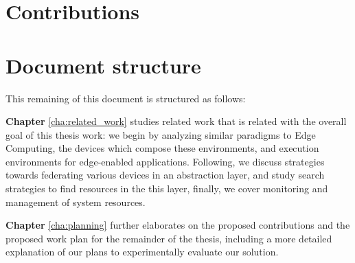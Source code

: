 \section{Contributions}

\section{Document structure}

This remaining of this document is structured as follows:

\textbf{Chapter} \ref{cha:related_work} studies related work that is related with the overall goal of this thesis work: we begin by analyzing similar paradigms to Edge Computing, the devices which compose these environments, and execution environments for edge-enabled applications. Following, we discuss strategies towards federating various devices in an abstraction layer, and study search strategies to find resources in the this layer, finally, we cover monitoring and management of system resources.

\textbf{Chapter} \ref{cha:planning} further elaborates on the proposed contributions and the proposed work plan for the remainder of the thesis, including a more detailed explanation of our plans to experimentally evaluate our solution.
